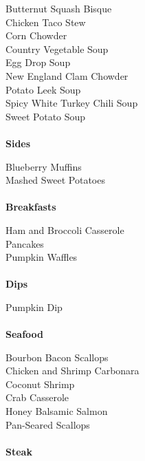 \documentclass[11pt, twoside, openany]{book}
\begin{document}
Butternut Squash Bisque\hrulefill\pageref{butternut-squash-bisque}\\
Chicken Taco Stew\hrulefill\pageref{chicken-taco-stew}\\
Corn Chowder\hrulefill\pageref{corn-chowder}\\
Country Vegetable Soup\hrulefill\pageref{country-vegetable-soup}\\
Egg Drop Soup\hrulefill\pageref{egg-drop-soup}\\
New England Clam Chowder\hrulefill\pageref{new-england-clam-chowder}\\
Potato Leek Soup\hrulefill\pageref{potato-leek-soup}\\
Spicy White Turkey Chili Soup\hrulefill\pageref{spicy-white-turkey-chili-soup}\\
Sweet Potato Soup\hrulefill\pageref{sweet-potato-soup}\\
{~\vspace{2mm}\\ \Large \textbf{Sides}}\hfill\textbf{\pageref{sides}}

Blueberry Muffins\hrulefill\pageref{blueberry-muffins}\\
Mashed Sweet Potatoes\hrulefill\pageref{mashed-sweet-potatoes}\\
{~\vspace{2mm}\\ \Large \textbf{Breakfasts}}\hfill\textbf{\pageref{breakfasts}}

Ham and Broccoli Casserole\hrulefill\pageref{ham-and-broccoli-casserole}\\
Pancakes\hrulefill\pageref{pancakes}\\
Pumpkin Waffles\hrulefill\pageref{pumpkin-waffles}\\
{~\vspace{2mm}\\ \Large \textbf{Dips}}\hfill\textbf{\pageref{dips}}

Pumpkin Dip\hrulefill\pageref{pumpkin-dip}\\
{~\vspace{2mm}\\ \Large \textbf{Seafood}}\hfill\textbf{\pageref{seafood}}

Bourbon Bacon Scallops\hrulefill\pageref{bourbon-bacon-scallops}\\
Chicken and Shrimp Carbonara\hrulefill\pageref{chicken-and-shrimp-carbonara}\\
Coconut Shrimp\hrulefill\pageref{coconut-shrimp}\\
Crab Casserole\hrulefill\pageref{crab-casserole}\\
Honey Balsamic Salmon\hrulefill\pageref{honey-balsamic-salmon}\\
Pan-Seared Scallops\hrulefill\pageref{pan-seared-scallops}\\
{~\vspace{2mm}\\ \Large \textbf{Steak}}\hfill\textbf{\pageref{steak}}
\end{document}
